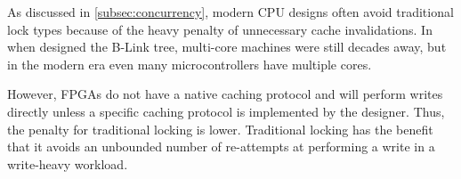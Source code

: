 
As discussed in \autoref{subsec:concurrency}, modern CPU designs often avoid
traditional lock types because of the heavy penalty of unnecessary cache
invalidations. In \citeyear{b-link} when \citeauthor{b-link} designed the B-Link
tree, multi-core machines were still decades away, but in the modern era even
many microcontrollers have multiple cores.

However, FPGAs do not have a native caching protocol and will perform writes
directly unless a specific caching protocol is implemented by the designer.
Thus, the penalty for traditional locking is lower. Traditional locking has the
benefit that it avoids an unbounded number of re-attempts at performing a write
in a write-heavy workload.




